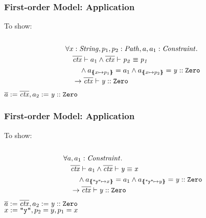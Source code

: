 
\begin{frame}[t]
\frametitle{First-order Model: Application}
To show: 
\quad\\\quad\\
\begin{align*}
&\forall x: \mathit{String}, p_1, p_2: \mathit{Path}, a, a_1: \mathit{Constraint}. \\
&\quad \overline{\mathit{ctx}} \vdash a_1
         \land \overline{\mathit{ctx}} \vdash \mathit{p_2} \equiv \mathit{p_1}\\
&\qquad  \land a_{\{\mskip-6.9mu\{ x \mapsto p_1 \}\mskip-6.9mu\}} = a_1 \land a_{\{\mskip-6.9mu\{ x \mapsto p_2 \}\mskip-6.9mu\}} = \mathit{y} :: \mathit{\texttt{Zero}}\\
&\quad   \rightarrow \overline{\mathit{ctx}} \vdash \mathit{y} :: \mathit{\texttt{Zero}}
\end{align*}
$\overline{a} := \overline{\mathit{ctx}}, a_2 := \mathit{y} :: \mathit{\texttt{Zero}}$\\
\pause
{}
\end{frame}

\begin{frame}[t]
\frametitle{First-order Model: Application}
To show: 
\quad\\\quad\\
\begin{align*}
&\forall a, a_1: \mathit{Constraint}. \\
&\quad \overline{\mathit{ctx}} \vdash a_1
         \land \overline{\mathit{ctx}} \vdash \mathit{y} \equiv \mathit{x}\\
&\qquad  \land a_{\{\mskip-6.9mu\{ \texttt{"y"} \mapsto x \}\mskip-6.9mu\}} = a_1 \land a_{\{\mskip-6.9mu\{ \texttt{"y"} \mapsto y \}\mskip-6.9mu\}} = \mathit{y} :: \mathit{\texttt{Zero}}\\
&\quad   \rightarrow \overline{\mathit{ctx}} \vdash \mathit{y} :: \mathit{\texttt{Zero}}
\end{align*}
$\overline{a} := \overline{\mathit{ctx}}, a_2 := \mathit{y} :: \mathit{\texttt{Zero}}$\\
$x := \texttt{"y"}, p_2 = y, p_1 = x$\\
\pause
{}
\end{frame}

